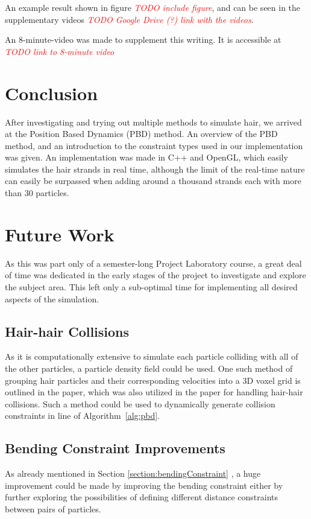 \documentclass[sigplan,screen,nonacm]{acmart}
\newcommand\TODO[1]{\textcolor{red}{\emph{TODO #1}}}
\begin{document}
An example result shown in figure \TODO{include figure}, and can be seen in the
supplementary videos \TODO{Google Drive (?) link with the videos}.

An 8-minute-video was made to supplement this writing. It is accessible at
\TODO{link to 8-minute video}

\section{Conclusion}
\label{sec:conclusion}
After investigating and trying out multiple methods to simulate hair, we arrived
at the Position Based Dynamics (PBD) method. An overview of the PBD method, and
an introduction to the constraint types used in our implementation was given.
An implementation was made in C++ and OpenGL, which easily simulates the hair
strands in real time, although the limit of the real-time nature can easily be
surpassed when adding around a thousand strands each with more than 30
particles.

\section{Future Work}
\label{sec:future_work}
As this was part only of a semester-long Project Laboratory course, a great deal
of time was dedicated in the early stages of the project to investigate and
explore the subject area. This left only a sub-optimal time for implementing all
desired aspects of the simulation.

\subsection{Hair-hair Collisions}
\label{subsec:future_work_collision}
As it is computationally extensive to simulate each particle colliding with all
of the other particles, a particle density field could be used. One such method
of grouping hair particles and their corresponding velocities into a 3D voxel
grid is outlined in the \citet{PixarVolumetricHair} paper, which was also
utilized in the \citet{FTLHair} paper for handling hair-hair collisions.
Such a method could be used to dynamically generate collision constraints in
line  of Algorithm~\ref{alg:pbd}.

\subsection{Bending Constraint Improvements}
As already mentioned in Section \ref{section:bendingConstraint}
, a huge improvement could be made by
improving the bending constraint either by further exploring the possibilities
of defining different distance constraints between pairs of particles.
\end{document}
